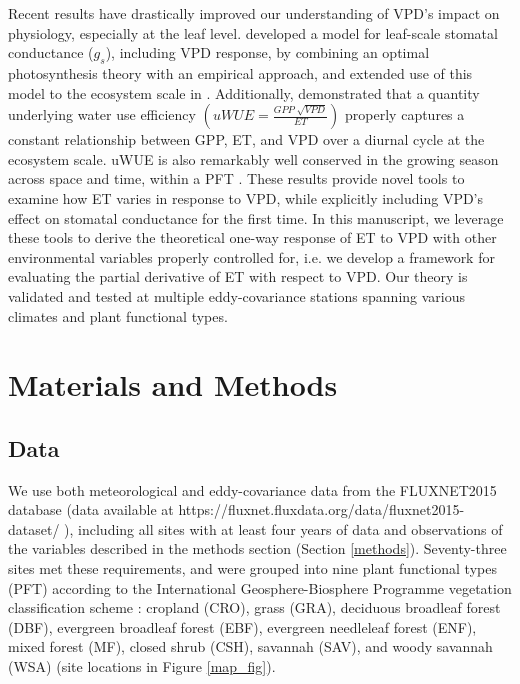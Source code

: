 \documentclass[draft,linenumbers]{afmjournal}
\begin{document}
Recent results have drastically improved our understanding of VPD's
impact on physiology, especially at the leaf
level. \citet{MEDLYN_2011} developed a model for leaf-scale stomatal
conductance ($g_s$), including VPD response, by combining an optimal
photosynthesis theory \citep{Cowan_1977} with an
empirical approach, and extended use of this model to the ecosystem
scale in \citet{Medlyn_2017}. Additionally, \citet{Zhou_2014}
demonstrated that a quantity underlying water use efficiency
$\left(uWUE = \frac{GPP\; \sqrt{VPD}}{ET}\right)$ properly captures a
constant relationship between GPP, ET, and VPD over a diurnal cycle at
the ecosystem scale. uWUE is also remarkably well conserved in the
growing season across space and time, within a PFT
\citep{Zhou_2015}. These results provide novel tools to examine how ET
varies in response to VPD, while explicitly including VPD's effect on
stomatal conductance for the first time. In this manuscript, we
leverage these tools to derive the theoretical one-way response of ET
to VPD with other environmental variables properly controlled for,
i.e. we develop a framework for evaluating the partial derivative of
ET with respect to VPD. Our theory is validated and tested at multiple
eddy-covariance stations spanning various climates and plant
functional types.

\section{Materials and Methods}
\subsection{Data}
\label{data}
We use both meteorological and eddy-covariance data from the
FLUXNET2015 database (data available at \sloppy
https://fluxnet.fluxdata.org/data/fluxnet2015-dataset/ \sloppy),
including all sites with at least four years of data and observations
of the variables described in the methods section (Section
\ref{methods}). Seventy-three sites met these requirements, and were
grouped into nine plant functional types (PFT) according to the
International Geosphere-Biosphere Programme vegetation classification
scheme \citep{Loveland_1999}: cropland (CRO), grass (GRA), deciduous
broadleaf forest (DBF), evergreen broadleaf forest (EBF), evergreen
needleleaf forest (ENF), mixed forest (MF), closed shrub (CSH),
savannah (SAV), and woody savannah (WSA) (site locations in Figure
\ref{map_fig}).
\end{document}
